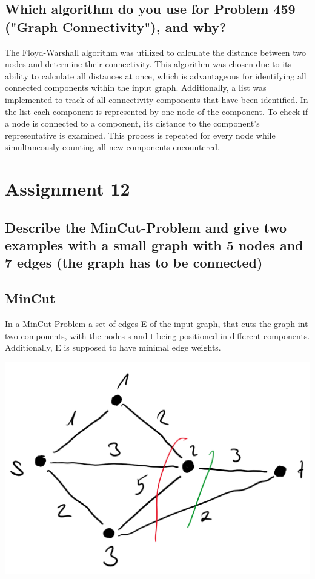 \documentclass[runningheads]{llncs}
\begin{document}
\subsection*{Which algorithm do you use for Problem 459 ("Graph Connectivity"), and why?}
The Floyd-Warshall algorithm was utilized to calculate the distance between two nodes and determine their connectivity. This algorithm was chosen due to its ability to calculate all distances at once, which is advantageous for identifying all connected components within
the input graph. Additionally, a list was implemented to track of all connectivity components that have been identified. In the list each component is represented by one node of the component. To check if a node is connected to a component, its distance to the component's
representative is examined. This process is repeated for every node while simultaneously counting all new components encountered.

\section*{Assignment 12}

\subsection*{Describe the MinCut-Problem and give two examples with a small graph with 5 nodes and 7 edges (the graph has to be connected)}

\subsection*{MinCut}
In a MinCut-Problem a set of edges E of the input graph, that cuts the graph int two components, with the nodes s and t being positioned in different components.
Additionally, E is supposed to have minimal edge weights.

\includegraphics[scale=0.5]{./resources/graph_1}
\end{document}
